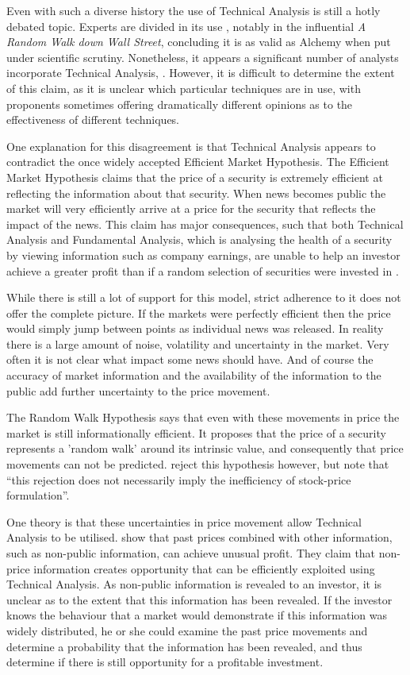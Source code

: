 \documentclass{article}
\begin{document}
Even with such a diverse history the use of Technical Analysis is still a hotly debated topic. Experts are divided in its use \citep{foundations}, notably in the influential \textit{A Random Walk down Wall Street}, concluding it is as valid as Alchemy when put under scientific scrutiny\cite[p.159]{randomwalk2012}. Nonetheless, it appears a significant number of analysts incorporate Technical Analysis, . However, it is difficult to determine the extent of this claim, as it is unclear which particular techniques are in use, with proponents sometimes offering dramatically different opinions as to the effectiveness of different techniques.

One explanation for this disagreement is that Technical Analysis appears to contradict the once widely accepted Efficient Market Hypothesis. The Efficient Market Hypothesis claims that the price of a security is extremely efficient at reflecting the information about that security. When news becomes public the market will very efficiently arrive at a price for the security that reflects the impact of the news. This claim has major consequences, such that both Technical Analysis and Fundamental Analysis, which is analysing the health of a security by viewing information such as company earnings, are unable to help an investor achieve a greater profit than if a random selection of securities were invested in \citep{emhAndCritics}. 

While there is still a lot of support for this model, strict adherence to it does not offer the complete picture. If the markets were perfectly efficient then the price would simply jump between points as individual news was released. In reality there is a large amount of noise, volatility and uncertainty in the market. Very often it is not clear what impact some news should have. And of course the accuracy of market information and the availability of the information to the public add further uncertainty to the price movement.

The Random Walk Hypothesis says that even with these movements in price the market is still informationally efficient. It proposes that the price of a security represents a 'random walk' around its intrinsic value, and consequently that price movements can not be predicted. \cite{lo1988} reject this hypothesis however, but note that ``this rejection does not necessarily imply the inefficiency of stock-price formulation''.

One theory is that these uncertainties in price movement allow Technical Analysis to be utilised. \cite{indefenseof} show that past prices combined with other information, such as non-public information, can achieve unusual profit. They claim that non-price information creates opportunity that can be efficiently exploited using Technical Analysis. As non-public information is revealed to an investor, it is unclear as to the extent that this information has been revealed. If the investor knows the behaviour that a market would demonstrate if this information was widely distributed, he or she could examine the past price movements and determine a probability that the information has been revealed, and thus determine if there is still opportunity for a profitable investment.
\end{document}
